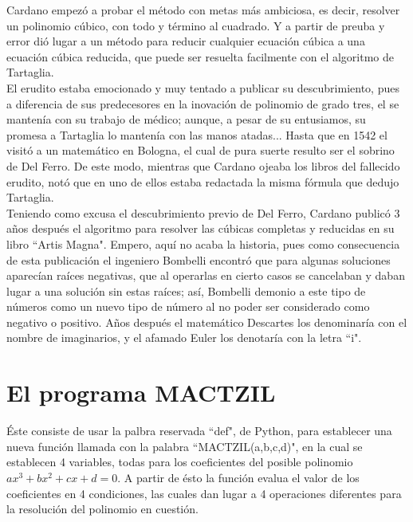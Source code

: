 \documentclass[12pt,letterpaper]{article}
\begin{document}
\noindent Cardano empezó a probar el método con metas más ambiciosa, es decir, resolver un polinomio cúbico, con todo y término al cuadrado. Y a partir de preuba y error dió lugar a un método para reducir cualquier ecuación cúbica a una ecuación cúbica reducida, que puede ser resuelta facilmente con el algoritmo de Tartaglia.
\\

\noindent El erudito estaba emocionado y muy tentado a publicar su descubrimiento, pues a diferencia de sus predecesores en la inovación de polinomio de grado tres, el se mantenía con su trabajo de médico; aunque, a pesar de su entusiamos, su promesa a Tartaglia lo mantenía con las manos atadas... Hasta que en 1542 el visitó a un matemático en Bologna, el cual de pura suerte resulto ser el sobrino de Del Ferro. De este modo, mientras que Cardano ojeaba los libros del fallecido erudito, notó que en uno de ellos estaba redactada la misma fórmula que dedujo Tartaglia.
\\

\noindent Teniendo como excusa el descubrimiento previo de Del Ferro, Cardano publicó 3 años después el algoritmo para resolver las cúbicas completas y reducidas en su libro ``Artis Magna". Empero, aquí no acaba la historia, pues como consecuencia de esta publicación el ingeniero Bombelli encontró que para algunas soluciones aparecían raíces negativas, que al operarlas en cierto casos se cancelaban y daban lugar a una solución sin estas raíces; así, Bombelli demonio a este tipo de números como un nuevo tipo de número al no poder ser considerado como negativo o positivo. Años después el matemático Descartes los denominaría con el nombre de imaginarios, y el afamado Euler los denotaría con la letra ``i".
\\

\section{El programa MACTZIL}

\noindent Éste consiste de usar la palbra reservada ``def", de Python, para establecer una nueva función llamada con la palabra ``MACTZIL(a,b,c,d)", en la cual se establecen 4 variables, todas para los coeficientes del posible polinomio $ax^{3}+bx^{2}+cx+d=0$. A partir de ésto la función evalua el valor de los coeficientes en 4 condiciones, las cuales dan lugar a 4 operaciones diferentes para la resolución del polinomio en cuestión.
\\
\end{document}
